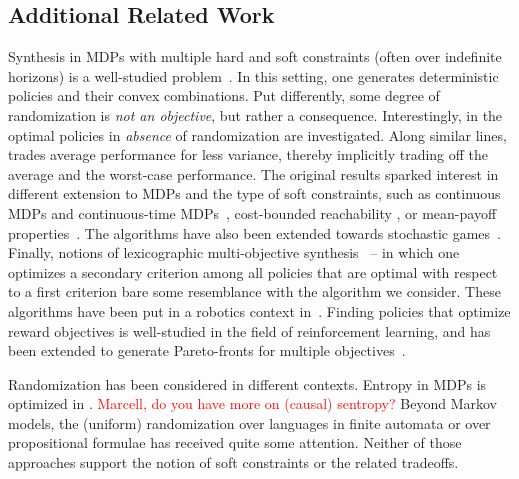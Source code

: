 \subsection{Additional Related Work}
 
Synthesis in MDPs with multiple hard and soft constraints (often over indefinite horizons) is a well-studied problem~\cite{DBLP:conf/stacs/ChatterjeeMH06,DBLP:conf/tacas/EtessamiKVY07,DBLP:conf/atva/ForejtKP12,DBLP:journals/fmsd/RandourRS17}.  In this setting, one generates deterministic policies and their convex combinations. Put differently, some degree of randomization is \emph{not an objective}, but rather a consequence. Interestingly, in \cite{DBLP:conf/tacas/DelgrangeKQR20} the optimal policies in \emph{absence} of randomization are investigated. Along similar lines, \cite{DBLP:journals/jcss/BrazdilCFK17} trades average performance for less variance, thereby implicitly trading off the average and the worst-case performance.  
The original results sparked interest in different extension to MDPs and the type of soft constraints, such as continuous MDPs \cite{DBLP:journals/csysl/HaesaertNS21} and continuous-time MDPs~\cite{DBLP:conf/cav/QuatmannJK17},  cost-bounded reachability \cite{DBLP:journals/jar/HartmannsJKQ20}, or mean-payoff properties~\cite{DBLP:journals/corr/abs-1104-3489}. 
The algorithms have also been extended towards stochastic games~\cite{DBLP:conf/mfcs/ChenFKSW13,DBLP:journals/sttt/KwiatkowskaPW18}.
Finally, notions of lexicographic multi-objective synthesis~\cite{DBLP:conf/cav/ChatterjeeKWW20} -- in which one optimizes a secondary criterion among all policies that are optimal with respect to a first criterion bare some resemblance with the algorithm we consider. 
These algorithms have been put in a robotics context in~\cite{DBLP:journals/ijrr/LacerdaFPH19}.
Finding policies that optimize reward objectives is well-studied in the field of reinforcement learning, and has been extended to generate Pareto-fronts for multiple objectives~\cite{DBLP:conf/icml/NatarajanT05,DBLP:conf/adprl/ParisiPSBR14}.

Randomization has been considered in different contexts. Entropy in MDPs is optimized in \cite{DBLP:journals/tac/SavasOCKT20}. 
\textcolor{red}{Marcell, do you have more on (causal) sentropy?}
Beyond Markov models, the (uniform) randomization over languages in finite automata \cite{DBLP:journals/siamcomp/HickeyC83,DBLP:conf/soda/KannanSM95} or over propositional formulae \cite{DBLP:journals/tcs/JerrumVV86,DBLP:journals/iandc/BellareGP00,DBLP:conf/dac/ChakrabortyMV14} has received quite some attention. Neither of those approaches support the notion of soft constraints or the related tradeoffs.

